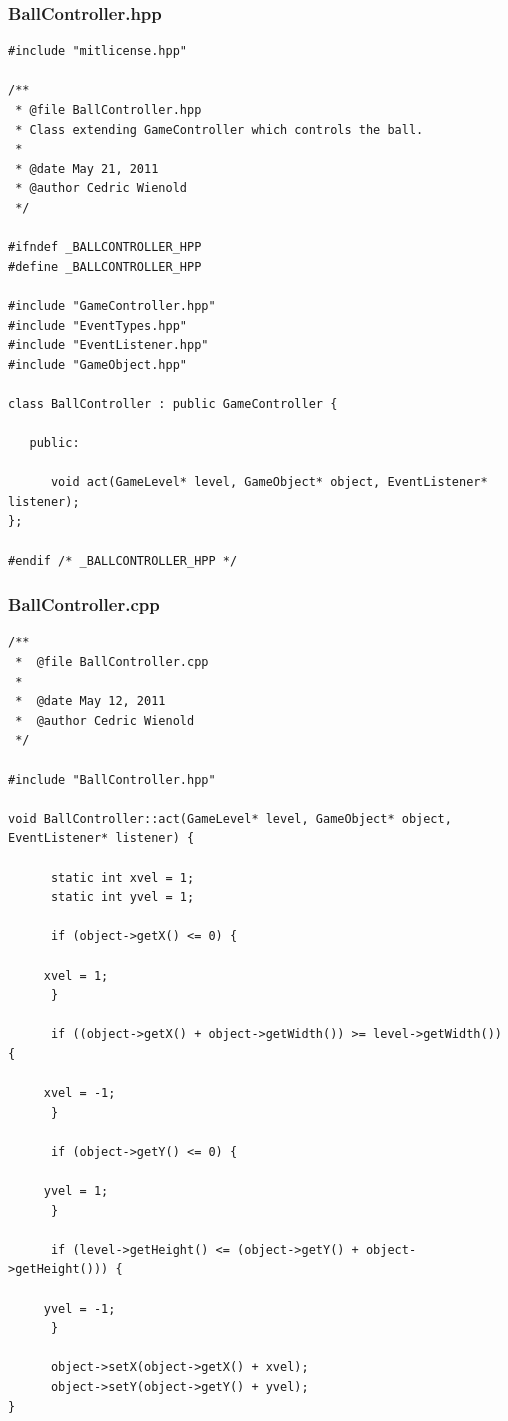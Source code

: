 \documentclass[12pt]{article}
\begin{document}
\subsubsection{BallController.hpp}
\begin{lstlisting}[breaklines]
#include "mitlicense.hpp"

/**
 * @file BallController.hpp
 * Class extending GameController which controls the ball.
 *
 * @date May 21, 2011
 * @author Cedric Wienold
 */

#ifndef _BALLCONTROLLER_HPP
#define _BALLCONTROLLER_HPP

#include "GameController.hpp"
#include "EventTypes.hpp"
#include "EventListener.hpp"
#include "GameObject.hpp"

class BallController : public GameController {
   
   public:
   
      void act(GameLevel* level, GameObject* object, EventListener* listener);
};

#endif /* _BALLCONTROLLER_HPP */
\end{lstlisting}
\subsubsection{BallController.cpp}
\begin{lstlisting}[breaklines]
/**
 *  @file BallController.cpp
 *
 *  @date May 12, 2011
 *  @author Cedric Wienold
 */

#include "BallController.hpp"

void BallController::act(GameLevel* level, GameObject* object, EventListener* listener) {

      static int xvel = 1;
      static int yvel = 1;

      if (object->getX() <= 0) {
	 
	 xvel = 1;
      }
      
      if ((object->getX() + object->getWidth()) >= level->getWidth()) {
	 
	 xvel = -1;
      }

      if (object->getY() <= 0) {
	 
	 yvel = 1;
      }
      
      if (level->getHeight() <= (object->getY() + object->getHeight())) {
	 
	 yvel = -1;
      }
      
      object->setX(object->getX() + xvel);
      object->setY(object->getY() + yvel);
}
\end{lstlisting}
\end{document}
